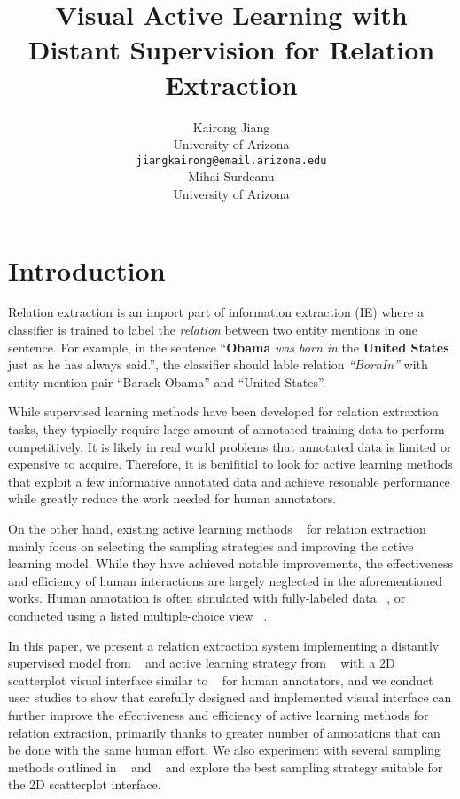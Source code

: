 \documentclass[11pt,a4paper]{article}
\title{Visual Active Learning with Distant Supervision for Relation Extraction}
\author{Kairong Jiang \\
    University of Arizona \\
    {\tt jiangkairong@email.arizona.edu}\\\And
    Mihai Surdeanu \\
    University of Arizona\\}
\date{}
\begin{document}
  \maketitle
  
  \section{Introduction}
  Relation extraction is an import part of information extraction (IE) where a classifier is trained to label the \emph{relation} between two entity mentions in one sentence. For example, in the sentence ``\textbf{Obama} \emph{was born in} the \textbf{United States} just as he has always said.'', the classifier should lable relation \emph{``BornIn''} with entity mention pair ``Barack Obama'' and ``United States''.

  While supervised learning methods have been developed for relation extraxtion tasks, they typiaclly require large amount of annotated training data to perform competitively. It is likely in real world problems that annotated data is limited or expensive to acquire. Therefore, it is benifitial to look for active learning methods that exploit a few informative annotated data and achieve resonable performance while greatly reduce the work needed for human annotators. 
  
  On the other hand, existing active learning methods ~\cite{angeli2014combining, fu2013efficient, sun2012active} for relation extraction mainly focus on selecting the sampling strategies and improving the active learning model. While they have achieved notable improvements, the effectiveness and efficiency of human interactions are largely neglected in the aforementioned works. Human annotation is often simulated with fully-labeled data ~\cite{fu2013efficient, sun2012active}, or conducted using a listed multiple-choice view ~\cite{angeli2014combining}. 
  
  In this paper, we present a relation extraction system implementing a distantly supervised model from ~\cite{surdeanu2012multi} and active learning strategy from ~\cite{angeli2014combining} with a 2D scatterplot visual interface similar to ~\cite{berger2014visual} for human annotators, and we conduct user studies to show that carefully designed and implemented visual interface can further improve the effectiveness and efficiency of active learning methods for relation extraction, primarily thanks to greater number of annotations that can be done with the same human effort. We also experiment with several sampling methods outlined in ~\cite{angeli2014combining} and ~\cite{berger2014visual} and explore the best sampling strategy suitable for the 2D scatterplot interface.
\end{document}
